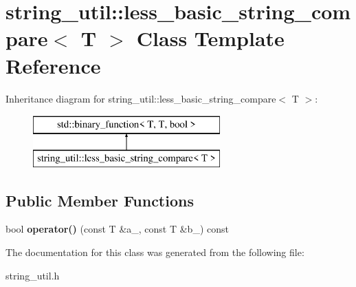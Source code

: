 \section{string\+\_\+util\+:\+:less\+\_\+basic\+\_\+string\+\_\+compare$<$ T $>$ Class Template Reference}
\label{classstring__util_1_1less__basic__string__compare}
Inheritance diagram for string\+\_\+util\+:\+:less\+\_\+basic\+\_\+string\+\_\+compare$<$ T $>$\+:\begin{figure}[H]
\begin{center}
\leavevmode
\includegraphics[height=2.000000cm]{classstring__util_1_1less__basic__string__compare}
\end{center}
\end{figure}
\subsection*{Public Member Functions}
\begin{DoxyCompactItemize}
\item 
bool {\bfseries operator()} (const T \&a\+\_\+, const T \&b\+\_\+) const \label{classstring__util_1_1less__basic__string__compare_a259341e58f36d8aaf75f2415de0df4d8}

\end{DoxyCompactItemize}


The documentation for this class was generated from the following file\+:\begin{DoxyCompactItemize}
\item 
string\+\_\+util.\+h\end{DoxyCompactItemize}
